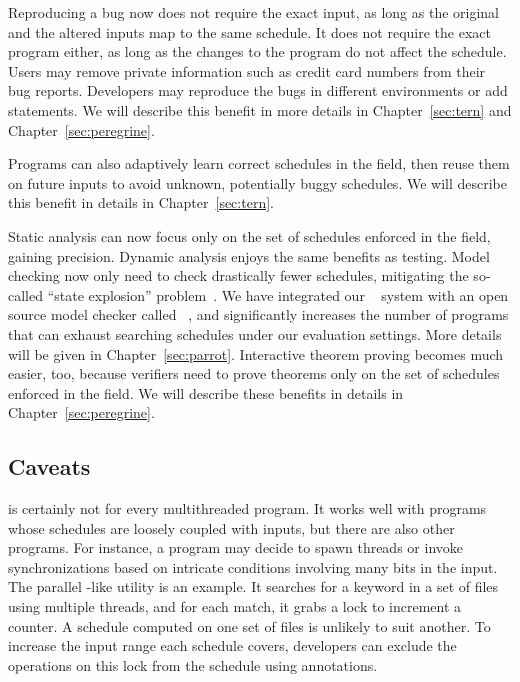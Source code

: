  Reproducing a bug now does not require the exact input,
as long as the original and the altered inputs map to the same schedule.
It does not require the exact program either, as long as the changes to
the program do not affect the schedule.  Users may remove private
information such as credit card numbers from their bug reports. Developers
may reproduce the bugs in different environments or add 
statements. We will describe this benefit in more details in
Chapter~\ref{sec:tern} and Chapter~\ref{sec:peregrine}.

  Programs can also adaptively learn correct
schedules in the field, then reuse them on future inputs to avoid unknown,
potentially buggy schedules.  We will describe this benefit in details in
Chapter~\ref{sec:tern}.

 Static analysis can now focus
only on the set of schedules enforced in the field, gaining
precision.  Dynamic analysis enjoys the same benefits as testing.  Model
checking now only need to check drastically fewer schedules, mitigating the
so-called ``state explosion'' problem~\cite{clarke:ModelChecking}. We have
integrated our \parrot~\cite{parrot:sosp13} system with an open source model
checker called \dbug~\cite{dbug:spin11}, and \parrot significantly increases the
number of programs that \dbug can exhaust searching schedules under our
evaluation settings. More details will be given in Chapter~\ref{sec:parrot}.
Interactive theorem proving becomes much easier, too, because verifiers
need to prove theorems only on the set of schedules enforced in the field.  We
will describe these benefits in details in Chapter~\ref{sec:peregrine}.


\subsection{Caveats}

\smt is certainly not for every multithreaded program.  It works well with
programs whose schedules are loosely coupled with inputs, but there are also
other programs.  For instance, a program may decide to spawn
threads or invoke synchronizations based on intricate conditions involving many
bits in the input. The parallel -like utility \pfscan is an example. 
It
searches for a keyword in a set of files using multiple threads, and for each
match, it grabs a lock to increment a counter.  A schedule computed on one set
of files is unlikely to suit another. To increase the input range each schedule
covers, developers can exclude the operations on this lock from the schedule
using annotations.


